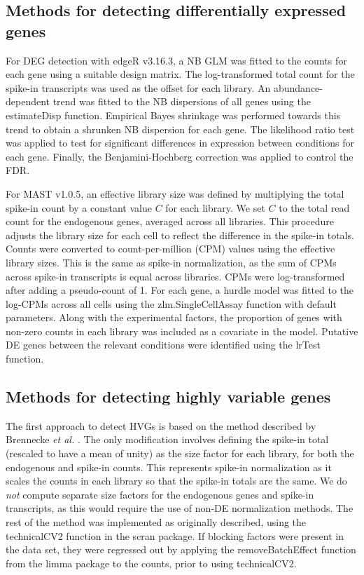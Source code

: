 \documentclass{article}
\begin{document}
\subsection{Methods for detecting differentially expressed genes}
For DEG detection with edgeR v3.16.3, a NB GLM was fitted to the counts for each gene \cite{mccarthy2012differential} using a suitable design matrix.
The log-transformed total count for the spike-in transcripts was used as the offset for each library.
An abundance-dependent trend was fitted to the NB dispersions of all genes using the estimateDisp function.
Empirical Bayes shrinkage was performed towards this trend to obtain a shrunken NB dispersion for each gene.
The likelihood ratio test was applied to test for significant differences in expression between conditions for each gene. 
Finally, the Benjamini-Hochberg correction was applied to control the FDR.

For MAST v1.0.5, an effective library size was defined by multiplying the total spike-in count by a constant value $C$ for each library.
We set $C$ to the total read count for the endogenous genes, averaged across all libraries.
This procedure adjusts the library size for each cell to reflect the difference in the spike-in totals.
Counts were converted to count-per-million (CPM) values using the effective library sizes.
This is the same as spike-in normalization, as the sum of CPMs across spike-in transcripts is equal across libraries.
CPMs were log-transformed after adding a pseudo-count of 1.
For each gene, a hurdle model was fitted to the log-CPMs across all cells using the zlm.SingleCellAssay function with default parameters.
Along with the experimental factors, the proportion of genes with non-zero counts in each library was included as a covariate \cite{finak2015mast} in the model.
Putative DE genes between the relevant conditions were identified using the lrTest function.

\subsection{Methods for detecting highly variable genes}
The first approach to detect HVGs is based on the method described by Brennecke \textit{et al.} \cite{brennecke2013accounting}.
The only modification involves defining the spike-in total (rescaled to have a mean of unity) as the size factor for each library, for both the endogenous and spike-in counts.
This represents spike-in normalization as it scales the counts in each library so that the spike-in totals are the same. 
We do \textit{not} compute separate size factors for the endogenous genes and spike-in transcripts, as this would require the use of non-DE normalization methods.
The rest of the method was implemented as originally described, using the technicalCV2 function in the scran package.
If blocking factors were present in the data set, they were regressed out by applying the removeBatchEffect function from the limma package to the counts, prior to using technicalCV2.
\end{document}
